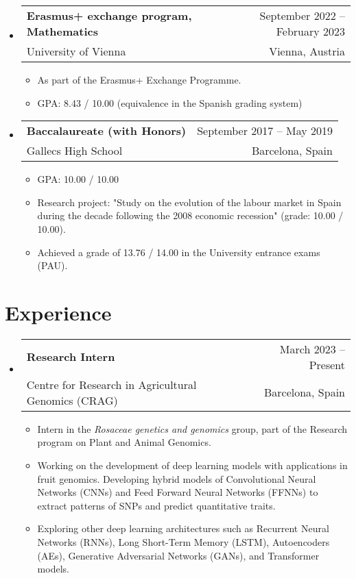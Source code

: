 \documentclass[a4paper,11pt]{article}
\makeatletter
\newcommand{\resumeQuadHeading}[4]{
  \item
  \begin{tabular*}{0.96\textwidth}[t]{l@{\extracolsep{\fill}}r}
    \textbf{#1} & \small #2 \\
    \small#3 & \small #4 \\
  \end{tabular*}
}
\newcommand{\resumeHeadingListStart}{
  \begin{itemize}[leftmargin=0.15in, label={}]
}
\newcommand{\resumeHeadingListEnd}{\end{itemize}}
\makeatother
\begin{document}
  \resumeHeadingListStart{}
    \resumeQuadHeading{Erasmus+ exchange program, Mathematics}{September 2022 – February 2023}
    {University of Vienna}{Vienna, Austria}
    \begin{itemize}[leftmargin=3em, itemsep=0.1em, topsep=2pt]
        \item \small As part of the Erasmus+ Exchange Programme.  
        \item \small GPA: 8.43 / 10.00 (equivalence in the Spanish grading system)
    \end{itemize}
  \resumeHeadingListEnd{}
  
  \resumeHeadingListStart{}
    \resumeQuadHeading{Baccalaureate (with Honors)}{September 2017 – May 2019}
    {Gallecs High School}{Barcelona, Spain}
    \begin{itemize}[leftmargin=3em, itemsep=0.1em, topsep=2pt]
      \item \small GPA: 10.00 / 10.00
      \item \small Research project: "Study on the evolution of the labour market in Spain during the decade following the 2008 economic recession" (grade: 10.00 / 10.00).
      \item \small Achieved a grade of 13.76 / 14.00 in the University entrance exams (PAU).
    \end{itemize}
  \resumeHeadingListEnd{}


\section{Experience}
  \resumeHeadingListStart{}
    \resumeQuadHeading{Research Intern}{March 2023 – Present}
    {Centre for Research in Agricultural Genomics (CRAG)}{Barcelona, Spain}
    \begin{itemize}[leftmargin=3em, itemsep=0.1em, topsep=2pt]
      \item \small Intern in the \textit{Rosaceae genetics and genomics} group, part of the Research program on Plant and Animal Genomics.
      \item \small Working on the development of deep learning models with applications in fruit genomics. Developing hybrid models of Convolutional Neural Networks (CNNs) and Feed Forward Neural Networks (FFNNs) to extract patterns of SNPs and predict quantitative traits.
      \item \small Exploring other deep learning architectures such as Recurrent Neural Networks (RNNs), Long Short-Term Memory (LSTM), Autoencoders (AEs), Generative Adversarial Networks (GANs), and Transformer models.
    \end{itemize}
  \resumeHeadingListEnd{}
\end{document}
